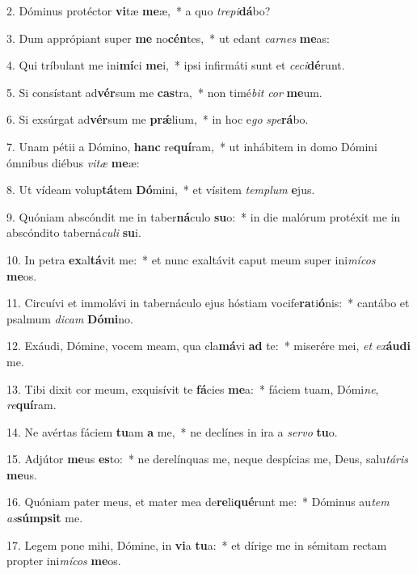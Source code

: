 2. Dóminus protéctor \textbf{vi}tæ \textbf{me}æ,~*  a quo \textit{tre}\textit{pi}\textbf{dá}bo?\

3. Dum apprópiant super \textbf{me} no\textbf{cén}tes,~*  ut edant \textit{car}\textit{nes} \textbf{me}as:\

4. Qui tríbulant me ini\textbf{mí}ci \textbf{me}i,~*  ipsi infirmáti sunt et \textit{ce}\textit{ci}\textbf{dé}runt.\

5. Si consístant ad\textbf{vér}sum me \textbf{cas}tra,~*  non timé\textit{bit} \textit{cor} \textbf{me}um.\

6. Si exsúrgat ad\textbf{vér}sum me \textbf{prǽ}lium,~*  in hoc e\textit{go} \textit{spe}\textbf{rá}bo.\

7. Unam pétii a Dómino, \textbf{hanc} re\textbf{quí}ram,~*  ut inhábitem in domo Dómini ómnibus diébus \textit{vi}\textit{tæ} \textbf{me}æ:\

8. Ut vídeam volup\textbf{tá}tem \textbf{Dó}mini,~*  et vísitem \textit{tem}\textit{plum} \textbf{e}jus.\

9. Quóniam abscóndit me in taber\textbf{ná}culo \textbf{su}o:~*  in die malórum protéxit me in abscóndito taberná\textit{cu}\textit{li} \textbf{su}i.\

10. In petra \textbf{ex}al\textbf{tá}vit me:~*  et nunc exaltávit caput meum super ini\textit{mí}\textit{cos} \textbf{me}os.\

11. Circuívi et immolávi in tabernáculo ejus hóstiam vocife\textbf{ra}ti\textbf{ó}nis:~*  cantábo et psalmum \textit{di}\textit{cam} \textbf{Dó}\textbf{mi}no.\

12. Exáudi, Dómine, vocem meam, qua cla\textbf{má}vi \textbf{ad} te:~*  miserére mei, \textit{et} \textit{ex}\textbf{áu}\textbf{di} me.\

13. Tibi dixit cor meum, exquisívit te \textbf{fá}cies \textbf{me}a:~*  fáciem tuam, Dómi\textit{ne}, \textit{re}\textbf{quí}ram.\

14. Ne avértas fáciem \textbf{tu}am \textbf{a} me,~*  ne declínes in ira a \textit{ser}\textit{vo} \textbf{tu}o.\

15. Adjútor \textbf{me}us \textbf{es}to:~*  ne derelínquas me, neque despícias me, Deus, salu\textit{tá}\textit{ris} \textbf{me}us.\

16. Quóniam pater meus, et mater mea de\textbf{re}li\textbf{qué}runt me:~*  Dóminus au\textit{tem} \textit{as}\textbf{súmp}\textbf{sit} me.\

17. Legem pone mihi, Dómine, in \textbf{vi}a \textbf{tu}a:~*  et dírige me in sémitam rectam propter ini\textit{mí}\textit{cos} \textbf{me}os.\

